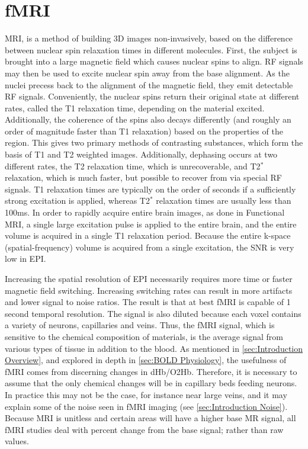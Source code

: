 \section{\ac{fMRI}}
\ac{MRI}, is a method of building 3D images
non-invasively, based on the difference between nuclear spin
relaxation times in different molecules. First, the subject 
is brought into a large magnetic field which causes nuclear spins
to align. \ac{RF} signals may
then be used to excite nuclear spin away from the base alignment. 
As the nuclei precess back to the alignment of the magnetic
field, they emit detectable \ac{RF} signals. Conveniently, the
nuclear spins return their original state at different
rates, called the \ac{T1} relaxation time, depending on the material excited.
Additionally, the
coherence of the spins also decays differently (and roughly an order of 
magnitude faster
than \ac{T1} relaxation) based on the properties of the region.
This gives two primary methods of contrasting substances,
which form the basis of \ac{T1} and \ac{T2} weighted images. Additionally, 
dephasing occurs at two different rates, the \ac{T2} relaxation time,
which is unrecoverable, and \ac{T2}$^*$ relaxation, which is
much faster, but possible to recover from via special \ac{RF} signals.
\ac{T1} relaxation times are typically on the order of seconds if 
a sufficiently strong excitation is applied, whereas \ac{T2}$^*$ relaxation
times are usually less than 100ms. 
In order to rapidly acquire entire brain images, as done in Functional 
\ac{MRI}, a single large excitation pulse is applied to the entire brain,
and the entire volume is acquired in a single \ac{T1} relaxation period. 
Because the entire k-space (spatial-frequency) volume is acquired 
from a single excitation, the \ac{SNR} is very low
in \ac{EPI}. 

Increasing the spatial resolution of \ac{EPI} necessarily 
requires more time or faster magnetic field switching. Increasing
switching rates can result in
more artifacts and lower signal to noise ratios. The result is
that at best \ac{fMRI} is capable of 1 second temporal resolution. 
The signal is also diluted because each voxel contains
a variety of neurons, capillaries and veins. 
Thus, the \ac{fMRI} signal, which is sensitive to the chemical composition of 
materials, is the average signal from various types of tissue
in addition to the blood. As mentioned in \autoref{sec:Introduction Overview},
and explored in depth in \autoref{sec:BOLD Physiology},
the usefulness of \ac{fMRI} comes from discerning changes in 
\ac{dHb}/\ac{O2Hb}. Therefore, it is necessary to assume
that the only chemical changes will be in
capillary beds feeding neurons. In practice this may not be the case, for
instance near large veins, and it may explain some of the
noise seen in \ac{fMRI} imaging (see \autoref{sec:Introduction Noise}). 
Because \ac{MRI} is unitless and certain
areas will have a higher base \ac{MR} signal, all \ac{fMRI} studies deal with
percent change from the base signal; rather than raw values. 

